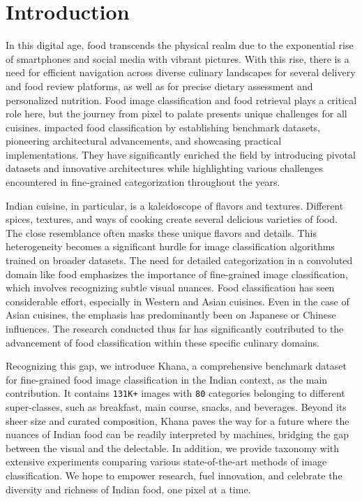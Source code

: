 \documentclass{article}
\begin{document}
\section{Introduction}
\label{sec:introduction}

In this digital age, food transcends the physical realm due to the exponential rise of smartphones and social media with vibrant pictures. With this rise, there is a need for efficient navigation across diverse culinary landscapes for several delivery and food review platforms, as well as for precise dietary assessment and personalized nutrition. Food image classification and food retrieval plays a critical role here, but the journey from pixel to palate presents unique challenges for all cuisines. \cite{arxiv.1907.06167, Min2020, Min2023} impacted food classification by establishing benchmark datasets, pioneering architectural advancements, and showcasing practical implementations. They have significantly enriched the field by introducing pivotal datasets and innovative architectures while highlighting various challenges encountered in fine-grained categorization throughout the years.

Indian cuisine, in particular, is a kaleidoscope of flavors and textures. Different spices, textures, and ways of cooking create several delicious varieties of food. The close resemblance often masks these unique flavors and details. This heterogeneity becomes a significant hurdle for image classification algorithms trained on broader datasets. The need for detailed categorization in a convoluted domain like food emphasizes the importance of fine-grained image classification, which involves recognizing subtle visual nuances. Food classification has seen considerable effort, especially in Western and Asian cuisines. Even in the case of Asian cuisines, the emphasis has predominantly been on Japanese or Chinese influences. The research conducted thus far has significantly contributed to the advancement of food classification within these specific culinary domains.

Recognizing this gap, we introduce Khana, a comprehensive benchmark dataset for fine-grained food image classification in the Indian context, as the main contribution. It contains \texttt{131K+} images with \texttt{80} categories belonging to different super-classes, such as breakfast, main course, snacks, and beverages. Beyond its sheer size and curated composition, Khana paves the way for a future where the nuances of Indian food can be readily interpreted by machines, bridging the gap between the visual and the delectable. In addition, we provide taxonomy with extensive experiments comparing various state-of-the-art methods of image classification. We hope to empower research, fuel innovation, and celebrate the diversity and richness of Indian food, one pixel at a time.
\end{document}
